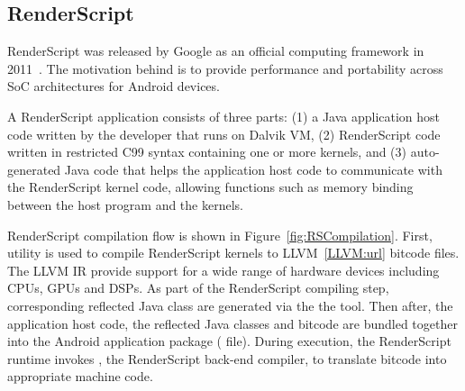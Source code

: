 
\subsection{RenderScript}
RenderScript was released by Google as an official computing framework in
2011~\cite{RenderScript}. The motivation behind is to provide
performance and portability across SoC architectures for Android devices.

A RenderScript application consists of three parts: (1) a Java application host
code written by the developer that runs on Dalvik VM, (2) RenderScript code
written in restricted C99 syntax containing one or more kernels, and (3)
auto-generated Java code that helps the application host code to communicate with
the RenderScript kernel code, allowing functions such as memory binding between the
host program and the kernels.


RenderScript compilation flow is shown in Figure~\ref{fig:RSCompilation}.
First,  utility is used to compile RenderScript kernels to
LLVM~\ref{LLVM:url} bitcode files. The LLVM IR provide support for a wide range of hardware
devices including CPUs, GPUs and DSPs. 
As part of the RenderScript compiling step, corresponding reflected Java class
are generated via the  the  tool.
Then after, the application host code, the reflected Java classes and bitcode
are bundled together into the Android application package ( file).
During execution, the RenderScript
runtime invokes , the RenderScript back-end compiler, to translate
bitcode into appropriate machine code.


